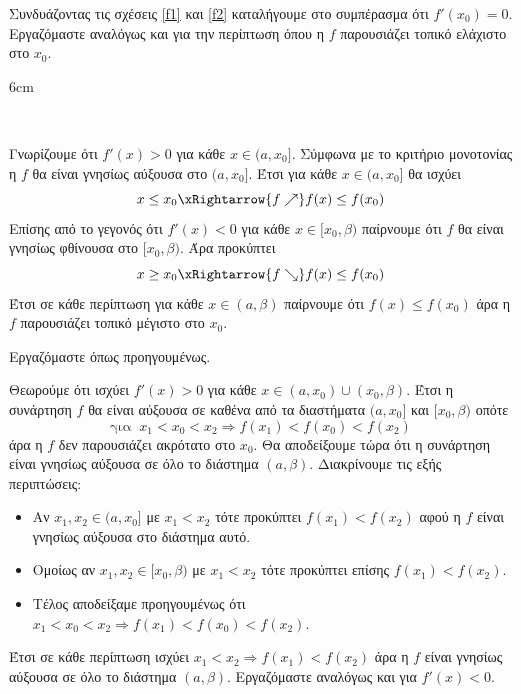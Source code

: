 Συνδυάζοντας τις σχέσεις \eqref{f1} και \eqref{f2} καταλήγουμε στο συμπέρασμα ότι $ f'(x_0)=0 $. Εργαζόμαστε αναλόγως και για την περίπτωση όπου η $ f $ παρουσιάζει τοπικό ελάχιστο στο $ x_0 $.
\begin{Thewrhmabox}{6cm}
\label{thewrhma:kritirio_topikwn_akrotatwn}
\end{Thewrhmabox}\mbox{}\\
\textbf{}
\begin{alist}
\item Γνωρίζουμε ότι $ f'(x)>0 $ για κάθε $ x\in(a,x_0] $. Σύμφωνα με το κριτήριο μονοτονίας η $ f $ θα είναι γνησίως αύξουσα στο $ (a,x_0] $. Έτσι για κάθε $ x\in(a,x_0] $ θα ισχύει
\[ x\leq x_0\xRightarrow{f\nearrow}f(x)\leq f(x_0) \]
Επίσης από το γεγονός ότι $ f'(x)<0 $ για κάθε $ x\in[x_0,\beta) $ παίρνουμε ότι $ f $ θα είναι γνησίως φθίνουσα στο $ [x_0,\beta) $. Άρα προκύπτει
\[ x\geq x_0\xRightarrow{f\searrow}f(x)\leq f(x_0) \]
Έτσι σε κάθε περίπτωση για κάθε $ x\in(a,\beta) $ παίρνουμε ότι $ f(x)\leq f(x_0) $ άρα η $ f $ παρουσιάζει τοπικό μέγιστο στο $ x_0 $.
\item Εργαζόμαστε όπως προηγουμένως.
\item Θεωρούμε ότι ισχύει $ f'(x)>0 $ για κάθε $ x\in(a,x_0)\cup(x_0,\beta) $. Έτσι η συνάρτηση $ f $ θα είναι αύξουσα σε καθένα από τα διαστήματα $ (a,x_0] $ και $ [x_0,\beta) $ οπότε 
\[ \textrm{για }\ x_1<x_0<x_2\Rightarrow f(x_1)<f(x_0)<f(x_2) \]
άρα η $ f $ δεν παρουσιάζει ακρότατο στο $ x_0 $. Θα αποδείξουμε τώρα ότι η συνάρτηση είναι γνησίως αύξουσα σε όλο το διάστημα $ (a,\beta) $. Διακρίνουμε τις εξής περιπτώσεις:
\begin{itemize}
\item Αν $ x_1,x_2\in(a,x_0] $ με $ x_1<x_2 $ τότε προκύπτει $ f(x_1)<f(x_2) $ αφού η $ f $ είναι γνησίως αύξουσα στο διάστημα αυτό.
\item Ομοίως αν $ x_1,x_2\in[x_0,\beta) $ με $ x_1<x_2 $ τότε προκύπτει επίσης $ f(x_1)<f(x_2) $.
\item Τέλος αποδείξαμε προηγουμένως ότι $ x_1<x_0<x_2\Rightarrow f(x_1)<f(x_0)<f(x_2) $.
\end{itemize}
Έτσι σε κάθε περίπτωση ισχύει $ x_1<x_2\Rightarrow f(x_1)<f(x_2) $ άρα η $ f $ είναι γνησίως αύξουσα σε όλο το διάστημα $ (a,\beta) $. Εργαζόμαστε αναλόγως και για $ f'(x)<0 $.
\end{alist}
